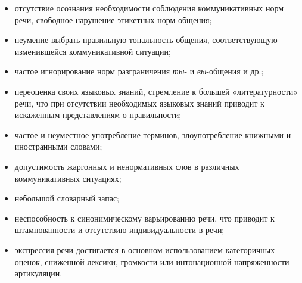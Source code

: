 \begin{itemize}
    \item отсутствие осознания необходимости соблюдения коммуникативных норм речи, свободное нарушение этикетных норм общения;
    \item неумение выбрать правильную тональность общения, соответствующую изменившейся коммуникативной ситуации;
    \item частое игнорирование норм разграничения \textit{ты}- и \textit{вы}-общения и др.;
    \item переоценка своих языковых знаний, стремление к большей «литературности» речи, что при отсутствии необходимых языковых знаний приводит к искаженным представлениям о правильности;
    \item частое и неуместное употребление терминов, злоупотребление книжными и иностранными словами;
    \item допустимость жаргонных и ненормативных слов в различных коммуникативных ситуациях;
    \item небольшой словарный запас;
    \item неспособность к синонимическому варьированию речи, что приводит к штампованности и отсутствию индивидуальности в речи;
    \item экспрессия речи достигается в основном использованием категоричных оценок, сниженной лексики, громкости или интонационной напряженности артикуляции.
\end{itemize}
